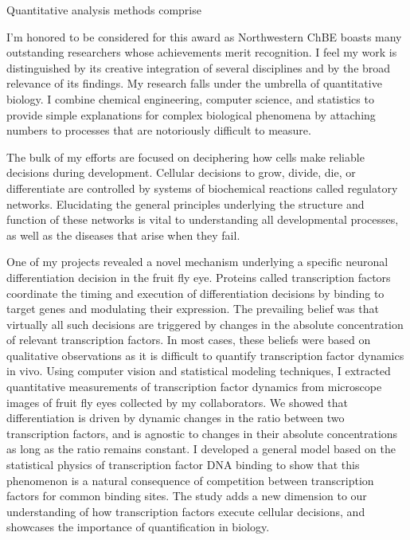 Quantitative analysis methods comprise  

I’m honored to be considered for this award as Northwestern ChBE boasts many outstanding researchers whose achievements merit recognition. I feel my work is distinguished by its creative integration of several disciplines and by the broad relevance of its findings. My research falls under the umbrella of quantitative biology. I combine chemical engineering, computer science, and statistics to provide simple explanations for complex biological phenomena by attaching numbers to processes that are notoriously difficult to measure. 

The bulk of my efforts are focused on deciphering how cells make reliable decisions during development. Cellular decisions to grow, divide, die, or differentiate are controlled by systems of biochemical reactions called regulatory networks. Elucidating the general principles underlying the structure and function of these networks is vital to understanding all developmental processes, as well as the diseases that arise when they fail.

One of my projects revealed a novel mechanism underlying a specific neuronal differentiation decision in the fruit fly eye. Proteins called transcription factors coordinate the timing and execution of differentiation decisions by binding to target genes and modulating their expression. The prevailing belief was that virtually all such decisions are triggered by changes in the absolute concentration of relevant transcription factors. In most cases, these beliefs were based on qualitative observations as it is difficult to quantify transcription factor dynamics in vivo. Using computer vision and statistical modeling techniques, I extracted quantitative measurements of transcription factor dynamics from microscope images of fruit fly eyes collected by my collaborators. We showed that differentiation is driven by dynamic changes in the ratio between two transcription factors, and is agnostic to changes in their absolute concentrations as long as the ratio remains constant. I developed a general model based on the statistical physics of transcription factor DNA binding to show that this phenomenon is a natural consequence of competition between transcription factors for common binding sites. The study adds a new dimension to our understanding of how transcription factors execute cellular decisions, and showcases the importance of quantification in biology. 


